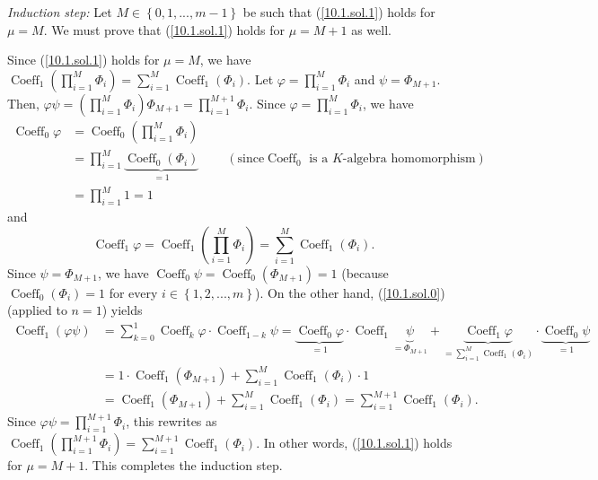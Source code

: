 \documentclass[numbers=enddot,12pt,final,onecolumn,notitlepage]{scrartcl}%
\begin{document}
\textit{Induction step:} Let $M\in\left\{  0,1,...,m-1\right\}  $ be such that
(\ref{10.1.sol.1}) holds for $\mu=M$. We must prove that (\ref{10.1.sol.1})
holds for $\mu=M+1$ as well.

Since (\ref{10.1.sol.1}) holds for $\mu=M$, we have $\operatorname*{Coeff}%
\nolimits_{1}\left(  \prod\limits_{i=1}^{M}\Phi_{i}\right)  =\sum
\limits_{i=1}^{M}\operatorname*{Coeff}\nolimits_{1}\left(  \Phi_{i}\right)  $.
Let $\varphi=\prod\limits_{i=1}^{M}\Phi_{i}$ and $\psi=\Phi_{M+1}$. Then,
$\varphi\psi=\left(  \prod\limits_{i=1}^{M}\Phi_{i}\right)  \Phi_{M+1}%
=\prod\limits_{i=1}^{M+1}\Phi_{i}$. Since $\varphi=\prod\limits_{i=1}^{M}%
\Phi_{i}$, we have
\begin{align*}
\operatorname*{Coeff}\nolimits_{0}\varphi &  =\operatorname*{Coeff}%
\nolimits_{0}\left(  \prod\limits_{i=1}^{M}\Phi_{i}\right) \\
&  =\prod\limits_{i=1}^{M}\underbrace{\operatorname*{Coeff}\nolimits_{0}%
\left(  \Phi_{i}\right)  }_{=1}\ \ \ \ \ \ \ \ \ \ \left(  \text{since
}\operatorname*{Coeff}\nolimits_{0}\text{ is a }K\text{-algebra homomorphism}%
\right) \\
&  =\prod\limits_{i=1}^{M}1=1
\end{align*}
and%
\[
\operatorname*{Coeff}\nolimits_{1}\varphi=\operatorname*{Coeff}\nolimits_{1}%
\left(  \prod\limits_{i=1}^{M}\Phi_{i}\right)  =\sum\limits_{i=1}%
^{M}\operatorname*{Coeff}\nolimits_{1}\left(  \Phi_{i}\right)  .
\]
Since $\psi=\Phi_{M+1}$, we have $\operatorname*{Coeff}\nolimits_{0}%
\psi=\operatorname*{Coeff}\nolimits_{0}\left(  \Phi_{M+1}\right)  =1$ (because
$\operatorname*{Coeff}\nolimits_{0}\left(  \Phi_{i}\right)  =1$ for every
$i\in\left\{  1,2,...,m\right\}  $). On the other hand, (\ref{10.1.sol.0})
(applied to $n=1$) yields%
\begin{align*}
\operatorname*{Coeff}\nolimits_{1}\left(  \varphi\psi\right)   &  =\sum
_{k=0}^{1}\operatorname*{Coeff}\nolimits_{k}\varphi\cdot\operatorname*{Coeff}%
\nolimits_{1-k}\psi=\underbrace{\operatorname*{Coeff}\nolimits_{0}\varphi
}_{=1}\cdot\operatorname*{Coeff}\nolimits_{1}\underbrace{\psi}_{=\Phi_{M+1}%
}+\underbrace{\operatorname*{Coeff}\nolimits_{1}\varphi}_{=\sum\limits_{i=1}%
^{M}\operatorname*{Coeff}\nolimits_{1}\left(  \Phi_{i}\right)  }%
\cdot\underbrace{\operatorname*{Coeff}\nolimits_{0}\psi}_{=1}\\
&  =1\cdot\operatorname*{Coeff}\nolimits_{1}\left(  \Phi_{M+1}\right)
+\sum\limits_{i=1}^{M}\operatorname*{Coeff}\nolimits_{1}\left(  \Phi
_{i}\right)  \cdot1\\
&  =\operatorname*{Coeff}\nolimits_{1}\left(  \Phi_{M+1}\right)
+\sum\limits_{i=1}^{M}\operatorname*{Coeff}\nolimits_{1}\left(  \Phi
_{i}\right)  =\sum\limits_{i=1}^{M+1}\operatorname*{Coeff}\nolimits_{1}\left(
\Phi_{i}\right)  .
\end{align*}
Since $\varphi\psi=\prod\limits_{i=1}^{M+1}\Phi_{i}$, this rewrites as
$\operatorname*{Coeff}\nolimits_{1}\left(  \prod\limits_{i=1}^{M+1}\Phi
_{i}\right)  =\sum\limits_{i=1}^{M+1}\operatorname*{Coeff}\nolimits_{1}\left(
\Phi_{i}\right)  $. In other words, (\ref{10.1.sol.1}) holds for $\mu=M+1$.
This completes the induction step.
\end{document}

